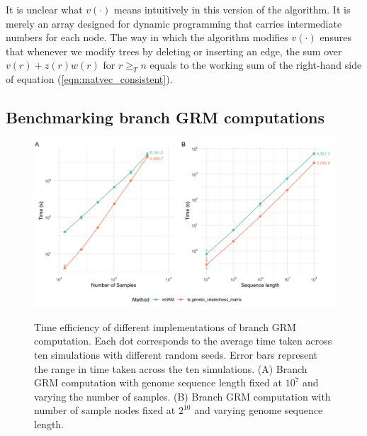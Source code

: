 It is unclear what $v(\cdot)$ means intuitively in this version of the algorithm.
It is merely an array designed for dynamic programming
that carries intermediate numbers for each node.
The way in which the algorithm modifies $v(\cdot)$ ensures that whenever we modify trees by deleting or inserting an edge, 
the sum over $v(r)+z(r)w(r)$  for $ r \ge_{T}n $ equals to the working sum of the right-hand side of equation (\ref{eqn:matvec_consistent}).

\subsection{Benchmarking branch GRM computations}

\begin{figure}[h!]
    \centering
    \includegraphics[width=\textwidth]{Figures/SIFig_benchmarking_plot.png}
    \label{fig:SI_benchmarking}
    \caption{Time efficiency of different implementations of branch GRM computation.
    Each dot corresponds to the average time taken across ten simulations with different random seeds.
    Error bars represent the range in time taken across the ten simulations.
    (A) Branch GRM computation with genome sequence length fixed at $10^{7}$ and varying the number of samples.
    (B) Branch GRM computation with number of sample nodes fixed at $2^{10}$ and varying genome sequence length.}
\end{figure}